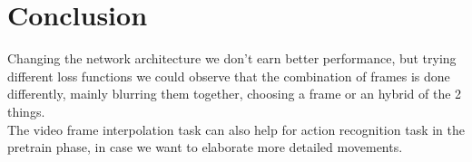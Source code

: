 \documentclass[11pt, a4paper]{article}
\begin{document}
	\section{Conclusion}
	Changing the network architecture we don't earn better performance, but trying different loss functions we could observe that the combination of frames is done differently, mainly blurring them together, choosing a frame or an hybrid of the 2 things.\\ 
	The video frame interpolation task can also help for action recognition task in the pretrain phase, in case we want to elaborate more detailed movements.
	
	
	
	
\end{document}
